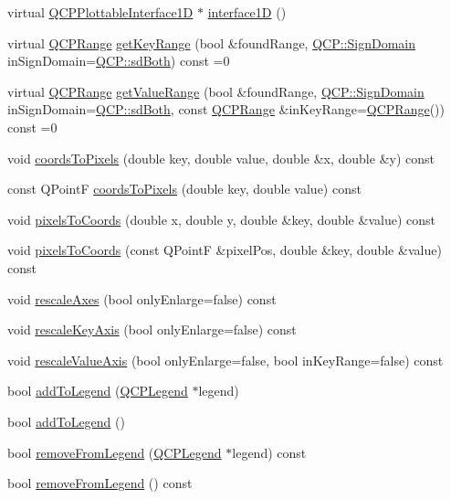 \begin{DoxyCompactItemize}
\item 
virtual \hyperlink{classQCPPlottableInterface1D}{Q\+C\+P\+Plottable\+Interface1D} $\ast$ \hyperlink{classQCPAbstractPlottable_a81fd9fd5c4f429c074785e2eb238a8e7}{interface1D} ()
\item 
virtual \hyperlink{classQCPRange}{Q\+C\+P\+Range} \hyperlink{classQCPAbstractPlottable_a4da16d3cd4b509e1104a9b0275623c96}{get\+Key\+Range} (bool \&found\+Range, \hyperlink{namespaceQCP_afd50e7cf431af385614987d8553ff8a9}{Q\+C\+P\+::\+Sign\+Domain} in\+Sign\+Domain=\hyperlink{namespaceQCP_afd50e7cf431af385614987d8553ff8a9aa38352ef02d51ddfa4399d9551566e24}{Q\+C\+P\+::sd\+Both}) const =0
\item 
virtual \hyperlink{classQCPRange}{Q\+C\+P\+Range} \hyperlink{classQCPAbstractPlottable_a4de773988b21ed090fddd27c6a3a3dcb}{get\+Value\+Range} (bool \&found\+Range, \hyperlink{namespaceQCP_afd50e7cf431af385614987d8553ff8a9}{Q\+C\+P\+::\+Sign\+Domain} in\+Sign\+Domain=\hyperlink{namespaceQCP_afd50e7cf431af385614987d8553ff8a9aa38352ef02d51ddfa4399d9551566e24}{Q\+C\+P\+::sd\+Both}, const \hyperlink{classQCPRange}{Q\+C\+P\+Range} \&in\+Key\+Range=\hyperlink{classQCPRange}{Q\+C\+P\+Range}()) const =0
\item 
void \hyperlink{classQCPAbstractPlottable_a7ad84a36472441cf1f555c5683d0da93}{coords\+To\+Pixels} (double key, double value, double \&x, double \&y) const
\item 
const Q\+PointF \hyperlink{classQCPAbstractPlottable_a5acb50ae984eef09a7ab92315d2ad708}{coords\+To\+Pixels} (double key, double value) const
\item 
void \hyperlink{classQCPAbstractPlottable_a3903c1120ab5c27e7fa46b597ef267bd}{pixels\+To\+Coords} (double x, double y, double \&key, double \&value) const
\item 
void \hyperlink{classQCPAbstractPlottable_a28d32c0062b9450847851ffdee1c5f69}{pixels\+To\+Coords} (const Q\+PointF \&pixel\+Pos, double \&key, double \&value) const
\item 
void \hyperlink{classQCPAbstractPlottable_a1491c4a606bccd2d09e65e11b79eb882}{rescale\+Axes} (bool only\+Enlarge=false) const
\item 
void \hyperlink{classQCPAbstractPlottable_ae96b83c961e257da116c6acf9c7da308}{rescale\+Key\+Axis} (bool only\+Enlarge=false) const
\item 
void \hyperlink{classQCPAbstractPlottable_a714eaf36b12434cd71846215504db82e}{rescale\+Value\+Axis} (bool only\+Enlarge=false, bool in\+Key\+Range=false) const
\item 
bool \hyperlink{classQCPAbstractPlottable_aa64e93cb5b606d8110d2cc0a349bb30f}{add\+To\+Legend} (\hyperlink{classQCPLegend}{Q\+C\+P\+Legend} $\ast$legend)
\item 
bool \hyperlink{classQCPAbstractPlottable_a70f8cabfd808f7d5204b9f18c45c13f5}{add\+To\+Legend} ()
\item 
bool \hyperlink{classQCPAbstractPlottable_a3cc235007e2343a65ad4f463767e0e20}{remove\+From\+Legend} (\hyperlink{classQCPLegend}{Q\+C\+P\+Legend} $\ast$legend) const
\item 
bool \hyperlink{classQCPAbstractPlottable_ac95fb2604d9106d0852ad9ceb326fe8c}{remove\+From\+Legend} () const
\end{DoxyCompactItemize}
